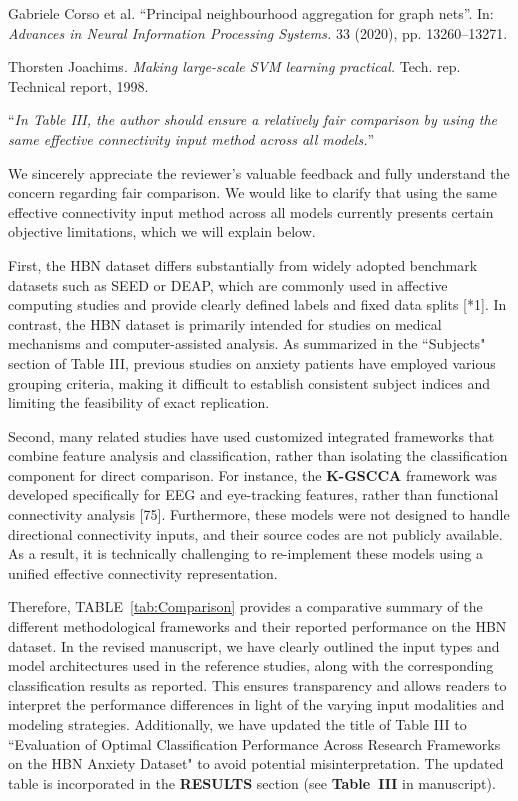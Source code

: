 \documentclass[12pt,technote,onecolumn]{IEEEtran}
\begin{document}
\noindent[65]\:Gabriele Corso et al. ``Principal neighbourhood aggregation
for graph nets”. In: \textit{Advances in Neural Information
Processing Systems.} 33 (2020), pp. 13260–13271.

\noindent[66]\:Thorsten Joachims. \textit{Making large-scale SVM learning
practical.} Tech. rep. Technical report, 1998.



\vspace{4mm}

 ``{\it In Table III, the author should ensure a relatively fair comparison by using the same effective connectivity input method across all models.}''
\vspace{1mm}

We sincerely appreciate the reviewer’s valuable feedback and fully understand the concern regarding fair comparison. We would like to clarify that using the same effective connectivity input method across all models currently presents certain objective limitations, which we will explain below.

First, the HBN dataset differs substantially from widely adopted benchmark datasets such as SEED or DEAP, which are commonly used in affective computing studies and provide clearly defined labels and fixed data splits [*1]. In contrast, the HBN dataset is primarily intended for studies on medical mechanisms and computer-assisted analysis. As summarized in the ``Subjects" section of Table III, previous studies on anxiety patients have employed various grouping criteria, making it difficult to establish consistent subject indices and limiting the feasibility of exact replication.

Second, many related studies have used customized integrated frameworks that combine feature analysis and classification, rather than isolating the classification component for direct comparison. For instance, the \textbf{K-GSCCA} framework was developed specifically for EEG and eye-tracking features, rather than functional connectivity analysis [75]. Furthermore, these models were not designed to handle directional connectivity inputs, and their source codes are not publicly available. As a result, it is technically challenging to re-implement these models using a unified effective connectivity representation.

Therefore, TABLE~\ref{tab:Comparison} provides a comparative summary of the different methodological frameworks and their reported performance on the HBN dataset. In the revised manuscript, we have clearly outlined the input types and model architectures used in the reference studies, along with the corresponding classification results as reported. This ensures transparency and allows readers to interpret the performance differences in light of the varying input modalities and modeling strategies. Additionally, we have updated the title of Table III to ``Evaluation of Optimal Classification Performance Across Research Frameworks on the HBN Anxiety Dataset" to avoid potential misinterpretation. The updated table is incorporated in the \textbf{RESULTS} section (see \textbf{Table~III} in manuscript).
\end{document}
